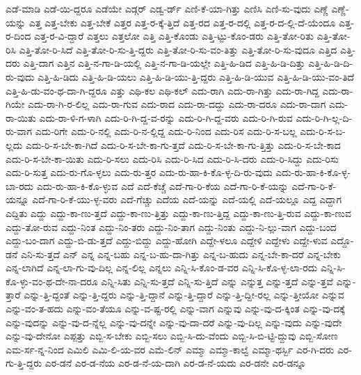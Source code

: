 {ಎಡೆ-ಮಾಡಿ
ಎಡೆ-ಯಿ-ದ್ದರೂ
ಎಡೆಯೇ
ಎಡ್ಗರ್
ಎಡ್ವ-ರ್ಡ್
ಎಣಿ-ಕೆ-ಯಾ-ಗಿತ್ತು
ಎಣಿಸಿ
ಎಣಿ-ಸು-ವುದು
ಎಣ್ಣೆ
ಎಣ್ಣೆ-ಯನ್ನು
ಎತ್ತ
ಎತ್ತ-ಬೇಕು
ಎತ್ತ-ಬೇಕೆ
ಎತ್ತರ
ಎತ್ತ-ರ-ಕ್ಕೆ-ತ್ತಿದೆ
ಎತ್ತ-ರದ
ಎತ್ತ-ರ-ದಲ್ಲಿ
ಎತ್ತ-ರ-ದ-ಲ್ಲಿ-ದೆ-ಯೆಂದೂ
ಎತ್ತ-ರ-ದಿಂದ
ಎತ್ತ-ರ-ವಿ-ದ್ದಾರೆ
ಎತ್ತಲು
ಎತ್ತಲೋ
ಎತ್ತಿ
ಎತ್ತಿ-ಕೊಂಡು
ಎತ್ತಿ-ಟ್ಟು-ಕೊಂ-ಡರು
ಎತ್ತಿ-ತೋ-ರಿತು
ಎತ್ತಿ-ತೋ-ರಿಸಿ
ಎತ್ತಿ-ತೋ-ರಿ-ಸಿದೆ
ಎತ್ತಿ-ತೋ-ರಿ-ಸು-ತ್ತಿ-ದ್ದರು
ಎತ್ತಿ-ತೋ-ರಿ-ಸು-ವಂ-ತಿತ್ತು
ಎತ್ತಿ-ತೋ-ರಿ-ಸು-ವುದೂ
ಎತ್ತಿದ
ಎತ್ತಿ-ದರು
ಎತ್ತಿ-ದಾಗ
ಎತ್ತಿನ
ಎತ್ತಿ-ನ-ಗಾ-ಡಿ-ಯಲ್ಲಿ
ಎತ್ತಿ-ನ-ಗಾ-ಡಿ-ಯಲ್ಲೇ
ಎತ್ತಿ-ಹಿ-ಡಿದ
ಎತ್ತಿ-ಹಿ-ಡಿ-ದಿತ್ತು
ಎತ್ತಿ-ಹಿ-ಡಿ-ದಿ-ರು-ವುದು
ಎತ್ತಿ-ಹಿ-ಡಿದು
ಎತ್ತಿ-ಹಿ-ಡಿ-ಯಲು
ಎತ್ತಿ-ಹಿ-ಡಿ-ಯು-ತ್ತಿ-ದ್ದರು
ಎತ್ತಿ-ಹಿ-ಡಿ-ಯುವ
ಎತ್ತಿ-ಹಿ-ಡಿ-ಯು-ವಂ-ತಿದೆ
ಎತ್ತಿ-ಹಿ-ಡು-ವಂ-ಥ-ದಾ-ಗಿ-ದ್ದರೂ
ಎತ್ತು
ಎಥಿ-ಕಲ
ಎಥಿ-ಕಲ್
ಎದು-ರಾಗಿ
ಎದು-ರಾ-ಗಿತ್ತು
ಎದು-ರಾ-ಗಿದ್ದ
ಎದು-ರಾ-ಗಿಯೇ
ಎದು-ರಾ-ಗಿ-ರ-ಲಿಲ್ಲ
ಎದು-ರಾ-ಗುವ
ಎದು-ರಾದ
ಎದು-ರಾ-ದದ್ದು
ಎದು-ರಾ-ದರೂ
ಎದು-ರಾ-ದಾಗ
ಎದು-ರಾ-ಯಿತು
ಎದು-ರಾ-ಳಿ-ಗ-ಳಾಗಿ
ಎದು-ರಿ-ಗಿ-ದ್ದ-ವ-ರನ್ನು
ಎದು-ರಿ-ಗಿ-ದ್ದ-ವರು
ಎದು-ರಿ-ಗಿ-ರುವ
ಎದು-ರಿ-ಗಿ-ಲ್ಲ-ದಿ-ರು-ವಾಗ
ಎದು-ರಿಗೇ
ಎದು-ರಿ-ನಲ್ಲಿ
ಎದು-ರಿ-ನ-ಲ್ಲಿದ್ದ
ಎದು-ರಿ-ನಿಂದ
ಎದು-ರಿಸ
ಎದು-ರಿ-ಸ-ಬಲ್ಲ
ಎದು-ರಿ-ಸ-ಬ-ಲ್ಲದು
ಎದು-ರಿ-ಸ-ಬೇ-ಕಾ-ಗಿದೆ
ಎದು-ರಿ-ಸ-ಬೇ-ಕಾ-ಗು-ತ್ತದೆ
ಎದು-ರಿ-ಸ-ಬೇ-ಕಾ-ಗು-ತ್ತಿತ್ತು
ಎದು-ರಿ-ಸ-ಬೇ-ಕಾದ
ಎದು-ರಿ-ಸ-ಬೇ-ಕಾ-ಯಿತು
ಎದು-ರಿ-ಸಲು
ಎದು-ರಿಸಿ
ಎದು-ರಿ-ಸಿದ
ಎದು-ರಿ-ಸಿ-ದರು
ಎದು-ರಿ-ಸಿದ್ದು
ಎದು-ರಿಸು
ಎದು-ರಿ-ಸುತ್ತ
ಎದು-ರು-ಗೊ-ಳ್ಳಲು
ಎದು-ರು-ತ್ತರ
ಎದು-ರು-ಹಾ-ಕಿ-ಕೊ-ಳ್ಳ-ದಿ-ರು-ವುದು
ಎದು-ರು-ಹಾ-ಕಿ-ಕೊ-ಳ್ಳ-ಬಾ-ರದು
ಎದು-ರು-ಹಾ-ಕಿ-ಕೊ-ಳ್ಳುವ
ಎದೆ
ಎದೆ-ಕೆಚ್ಚೆ
ಎದೆ-ಗಾ-ರಿ-ಕೆಯ
ಎದೆ-ಗಾ-ರಿ-ಕೆ-ಯನ್ನು
ಎದೆ-ಗಾ-ರಿ-ಕೆ-ಯನ್ನೂ
ಎದೆ-ಗಾ-ರಿ-ಕೆ-ಯು-ಳ್ಳ-ವರು
ಎದೆ-ಗೆಚ್ಚು
ಎದೆಯ
ಎದೆ-ಯನ್ನು
ಎದೆ-ಯಲ್ಲಿ
ಎದೆ-ಯಲ್ಲೂ
ಎದ್ದ
ಎದ್ದಾಗ
ಎದ್ದಿತು
ಎದ್ದು
ಎದ್ದು-ಕಾ-ಣು-ತ್ತದೆ
ಎದ್ದು-ಕಾ-ಣು-ತ್ತಿತ್ತು
ಎದ್ದು-ಕಾ-ಣು-ತ್ತಿದ್ದ
ಎದ್ದು-ಕಾ-ಣು-ತ್ತಿ-ರುವ
ಎದ್ದು-ಕಾ-ಣುವ
ಎದ್ದು-ತೋ-ರುವ
ಎದ್ದು-ನಿಂತ
ಎದ್ದು-ನಿಂ-ತರು
ಎದ್ದು-ನಿಂ-ತಾಗ
ಎದ್ದು-ನಿಂತು
ಎದ್ದು-ನಿ-ಲ್ಲು-ವಾಗ
ಎದ್ದು-ಬಂದ
ಎದ್ದು-ಬಂ-ದಾಗ
ಎದ್ದು-ಬಿ-ಡು-ತ್ತದೆ
ಎದ್ದು-ಬಿದ್ದು
ಎದ್ದು-ಹೋಗಿ
ಎದ್ದೇ-ಳಲೂ
ಎದ್ದೇಳಿ
ಎದ್ದೇಳು
ಎದ್ದೇ-ಳುವ
ಎದ್ದೊ-ಡನೆ
ಎನಿ-ಸು-ತ್ತದೆ
ಎನ್
ಎನ್ನ
ಎನ್ನ-ಬಹು
ಎನ್ನ-ಬ-ಹು-ದಾ-ಗಿತ್ತು
ಎನ್ನ-ಬ-ಹುದು
ಎನ್ನ-ಬೇ-ಕಾ-ದರೆ
ಎನ್ನ-ಬೇಕು
ಎನ್ನ-ಲಾಗಿದೆ
ಎನ್ನ-ಲಾ-ಗು-ವು-ದಿಲ್ಲ
ಎನ್ನ-ಲಿಲ್ಲ
ಎನ್ನಲು
ಎನ್ನಿ-ಸಿ-ಕೊಂ-ಡ-ವರ
ಎನ್ನಿ-ಸಿ-ಕೊ-ಳ್ಳ-ಲಾ-ರದು
ಎನ್ನಿ-ಸಿ-ಕೊ-ಳ್ಳು-ವಂ-ಥ-ದೇ-ನಾ-ದರೂ
ಎನ್ನಿ-ಸಿತು
ಎನ್ನಿ-ಸು-ತ್ತದೆ
ಎನ್ನಿ-ಸು-ತ್ತಿದೆ
ಎನ್ನು
ಎನ್ನುತ್ತ
ಎನ್ನು-ತ್ತದೆ
ಎನ್ನು-ತ್ತವೆ
ಎನ್ನು-ತ್ತಾರೆ
ಎನ್ನು-ತ್ತಿ-ದ್ದಂತೆ
ಎನ್ನು-ತ್ತಿ-ದ್ದರು
ಎನ್ನು-ತ್ತಿ-ದ್ದಾನೆ
ಎನ್ನು-ತ್ತಿ-ದ್ದಾರೆ
ಎನ್ನು-ತ್ತಿ-ದ್ದೀ-ರಲ್ಲ
ಎನ್ನು-ತ್ತೀಯೋ
ಎನ್ನುವ
ಎನ್ನು-ವಂ-ತ-ಹದು
ಎನ್ನು-ವಂ-ತೆಯೂ
ಎನ್ನು-ವ-ಷ್ಟ-ರಲ್ಲಿ
ಎನ್ನು-ವಾಗ
ಎನ್ನುವು
ಎನ್ನು-ವು-ದ-ಕ್ಕಿಂತ
ಎನ್ನು-ವು-ದಕ್ಕೆ
ಎನ್ನು-ವುದನ್ನು
ಎನ್ನು-ವು-ದ-ನ್ನೆಲ್ಲ
ಎನ್ನು-ವು-ದನ್ನೇ
ಎನ್ನು-ವು-ದಾ-ದರೆ
ಎನ್ನು-ವು-ದಿಲ್ಲ
ಎನ್ನು-ವುದು
ಎನ್ನು-ವುದೇ
ಎನ್ನು-ವು-ದೇನೋ
ಎಪ್ಪತ್ತು
ಎಬ್ಬಿ-ಸ-ಬೇಕು
ಎಬ್ಬಿ-ಸಲು
ಎಬ್ಬಿ-ಸಿ-ದು-ವೆಂದು
ಎಬ್ಬಿ-ಸಿ-ಬಿ-ಟ್ಟಿ-ದ್ದುವು
ಎಬ್ಬಿ-ಸೋಣ
ಎಮ-ರ್ಸ-ನ್ನ-ನಿಂದ
ಎಮಿಲಿ
ಎಮಿ-ಲಿ-ಯ-ವರ
ಎಮೆ-ಲಿನ್
ಎಮ್ಮಾ
ಎಮ್ಮಾ-ಕಾಲ್ವೆ
ಎಮ್ಮಾ-ಥರ್ಸ್ಬಿ
ಎರ-ಗಿ-ದರು
ಎರ-ಗು-ತ್ತಿ-ದ್ದರು
ಎರ-ಡನೆ
ಎರ-ಡ-ನೆಯ
ಎರ-ಡ-ನೆ-ಯ-ದಾಗಿ
ಎರ-ಡ-ನೆ-ಯದು
ಎರ-ಡನೇ
ಎರ-ಡನ್ನೂ
}
